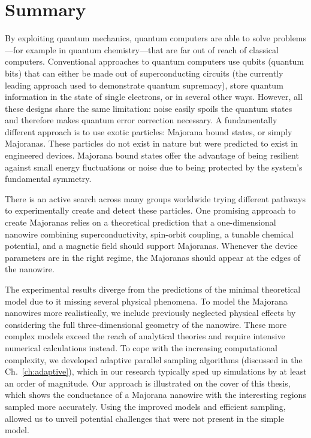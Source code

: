 \chapter*{Summary}

By exploiting quantum mechanics, quantum computers are able to solve problems---for example in quantum chemistry---that are far out of reach of classical computers.
Conventional approaches to quantum computers use qubits (quantum bits) that can either be made out of superconducting circuits (the currently leading approach used to demonstrate quantum supremacy), store quantum information in the state of single electrons, or in several other ways.
However, all these designs share the same limitation: noise easily spoils the quantum states and therefore makes quantum error correction necessary.
A fundamentally different approach is to use exotic particles: Majorana bound states, or simply Majoranas.
These particles do not exist in nature but were predicted to exist in engineered devices.
Majorana bound states offer the advantage of being resilient against small energy fluctuations or noise due to being protected by the system's fundamental symmetry.

There is an active search across many groups worldwide trying different pathways to experimentally create and detect these particles.
One promising approach to create Majoranas relies on a theoretical prediction that a one-dimensional nanowire combining superconductivity, spin-orbit coupling, a tunable chemical potential, and a magnetic field should support Majoranas.
Whenever the device parameters are in the right regime, the Majoranas should appear at the edges of the nanowire.

The experimental results diverge from the predictions of the minimal theoretical model due to it missing several physical phenomena.
To model the Majorana nanowires more realistically, we include previously neglected physical effects by considering the full three-dimensional geometry of the nanowire.
These more complex models exceed the reach of analytical theories and require intensive numerical calculations instead.
To cope with the increasing computational complexity, we developed adaptive parallel sampling algorithms (discussed in the Ch.~\ref{ch:adaptive}), which in our research typically sped up simulations by at least an order of magnitude.
Our approach is illustrated on the cover of this thesis, which shows the conductance of a Majorana nanowire with the interesting regions sampled more accurately.
Using the improved models and efficient sampling, allowed us to unveil potential challenges that were not present in the simple model.

